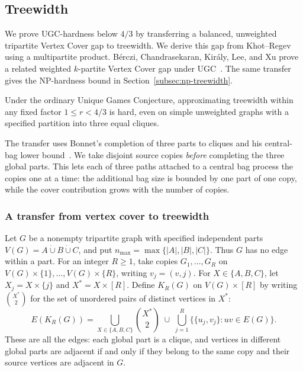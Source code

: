 \subsection{Treewidth}
\label{sec:tw-transfer}

We prove \textup{UGC}-hardness below $4/3$ by transferring a balanced,
unweighted tripartite Vertex Cover gap to treewidth. We derive this
gap from Khot--Regev using a multipartite product. B\'erczi,
Chandrasekaran, Kir\'aly, Lee, and Xu prove a related weighted
$k$-partite Vertex Cover gap under \textup{UGC}~\cite[Sections~3.5--3.6]{BCKLX2017}.
The same transfer gives the \textup{NP}-hardness bound in
Section~\ref{subsec:np-treewidth}.

\begin{theorem}\label{thm:tw-ugc}
Under the ordinary Unique Games Conjecture, approximating treewidth
within any fixed factor $1\leq r<4/3$ is hard, even on simple
unweighted graphs with a specified partition into three equal cliques.
\end{theorem}

The transfer uses Bonnet's completion of three parts to cliques
and his central-bag lower bound~\cite[Lemma~6]{BonnetTreewidth}.
We take disjoint source copies \emph{before} completing the three global parts.
This lets each of three paths attached to a central bag process
the copies one at a time: the additional bag size is bounded by one part of one copy,
while the cover contribution grows with the number of copies.

\subsubsection{A transfer from vertex cover to treewidth}

Let $G$ be a nonempty tripartite graph with specified independent
parts $V(G)=A\mathbin{\dot\cup}B\mathbin{\dot\cup}C$, and put
$n_{\max}=\max\{|A|,|B|,|C|\}$. Thus $G$ has no edge within a part.
For an integer $R\ge1$, take copies $G_1,\ldots,G_R$ on
$V(G)\times\{1\},\ldots,V(G)\times\{R\}$, writing $v_j=(v,j)$.
For $X\in\{A,B,C\}$, let $X_j=X\times\{j\}$ and
$X^*=X\times[R]$. Define $K_R(G)$ on $V(G)\times[R]$ by
writing $\binom{X^*}{2}$ for the set of unordered pairs of distinct
vertices in $X^*$:
\[
 E(K_R(G))=
 \bigcup_{X\in\{A,B,C\}}\binom{X^*}{2}
 \;\cup\;\bigcup_{j=1}^R\{\{u_j,v_j\}:uv\in E(G)\}.
\]
These are all the edges: each global part is a
clique, and vertices in different global parts are adjacent if and only if
they belong to the same copy and their source vertices are
adjacent in $G$.


